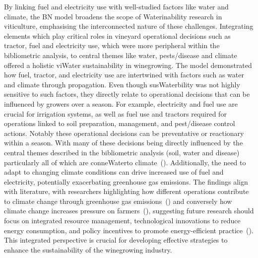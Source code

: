 \documentclass[10pt,letterpaper]{article}
\begin{document}
By linking fuel and electricity use with well-studied factors like water and climate, the BN model broadens the scope of Waterinability research in viticulture, emphasising the interconnected nature of these challenges. Integrating elements which play critical roles in vineyard operational decisions such as tractor, fuel and electricity use, which were more peripheral within the bibliometric analysis, to central themes like water, pests/disease and climate offered a holistic viWater sustainability in winegrowing. The model demonstrated how fuel, tractor, and electricity use are intertwined with factors such as water and climate through propagation. Even though susWaterbility was not highly sensitive to such factors, they directly relate to operational decisions that can be influenced by growers over a season. For example, electricity and fuel use are crucial for irrigation systems, as well as fuel use and tractors required for operations linked to soil preparation, management, and pest/disease control actions. Notably these operational decisions can be preventative or reactionary within a season. With many of these decisions being directly influenced by the central themes described in the bibliometric analysis (soil, water and disease) particularly all of which are conneWaterto climate~(\cite{fragaClimateChangeNew2020,tofaloClimateChangeWine2023,naigeonDATADecisionmakingViticulture2023}). Additionally, the need to adapt to changing climate conditions can drive increased use of fuel and electricity, potentially exacerbating greenhouse gas emissions. The findings align with literature, with researchers highlighting how different operations contribute to climate change through greenhouse gas emissions~(\cite{pilafidisAssessingEnergyUse2023,cechPesticideUseAssociated2022,zhangEstimatingEconomicEnvironmental2019}) and conversely how climate change increases pressure on farmers~(\cite{barnaEditorialImprovingSustainability2023,costaRoleSoilTemperature2023,atakClimateChangeAdaptive2024}), suggesting future research should focus on integrated resource management, technological innovations to reduce energy consumption, and policy incentives to promote energy-efficient practice~(\cite{pereiraViticultureClimateChange2023}). This integrated perspective is crucial for developing effective strategies to enhance the sustainability of the winegrowing industry.
\end{document}

